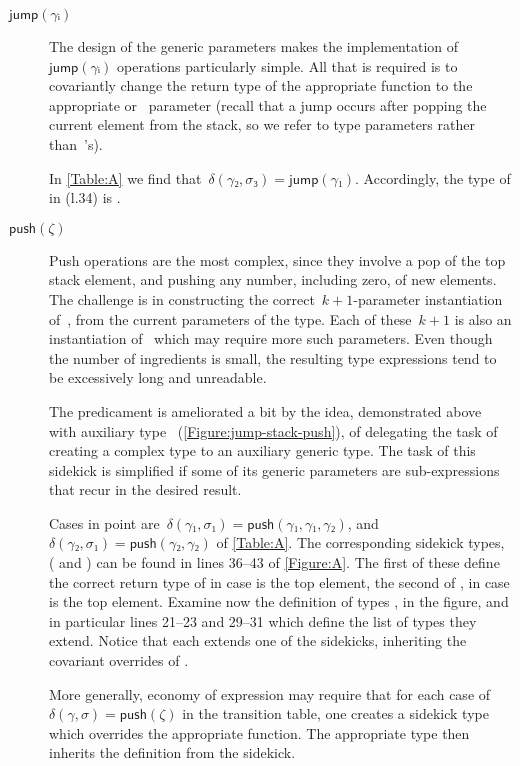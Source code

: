 \documentclass[a4paper,USenglish]{lipics-v2016}
\begin{document}
\begin{description}
  \item[$\textsf{jump}(γᵢ)$]
  The design of the generic parameters makes the implementation of~$\textsf{jump}(γᵢ)$
    operations particularly simple.
  All that is required is to covariantly change the return type of the
    appropriate  function to the appropriate  or~ parameter
    (recall that a jump occurs after popping the current element from the stack, so 
    we refer to  type parameters rather than~'s).
  \par
  In \cref{Table:A} we find that~$δ(γ₂,σ₃) =\textsf{jump}(γ₁)$. 
  Accordingly, the type of  in  (l.34) is .

  \item[$\textsf{push}(ζ)$]
  Push operations are the most complex, since they involve a pop of the top stack element,
    and pushing any number, including zero, of new elements.
  The challenge is in constructing the correct~$k+1$-parameter instantiation of~,
    from the current parameters of the type.
  Each of these~$k+1$ is also an instantiation of~ which may require more such
    parameters.
  Even though the number of ingredients is small, the resulting type expressions
    tend to be excessively long and unreadable.
  \par
  The predicament is ameliorated a bit by the idea,
    demonstrated above with auxiliary type~
    (\cref{Figure:jump-stack-push}),
    of delegating the task of creating a complex type to an auxiliary
    generic type.
  The task of this sidekick is simplified if some of its generic
  parameters are sub-expressions that recur in the desired
  result.
  \par
  Cases in point
    are~$δ(γ₁,σ₁)=\textsf{push}(γ₁,γ₁,γ₂)$, and~$δ(γ₂,σ₁)=\textsf{push}(γ₂,γ₂)$ of \cref{Table:A}.
  The corresponding sidekick types,
    ( and )
    can be found in lines 36--43 of \cref{Figure:A}.
  The first of these define the correct return type
    of  in case  is the top element,
    the second of , in case  is the top element.
  Examine now the definition of types , in the figure,
    and in particular lines 21--23 and 29--31 which define the list of types they extend.
  Notice that each extends one of the sidekicks, inheriting the covariant
    overrides of .
  \par
  More generally, economy of expression may require that for each case
    of~$δ(γ,σ)=\textsf{push}(ζ)$ in the transition table,
    one creates a sidekick type which overrides the appropriate 
    function.
  The appropriate  type then inherits the definition
    from the sidekick.
\end{description}
\end{document}
